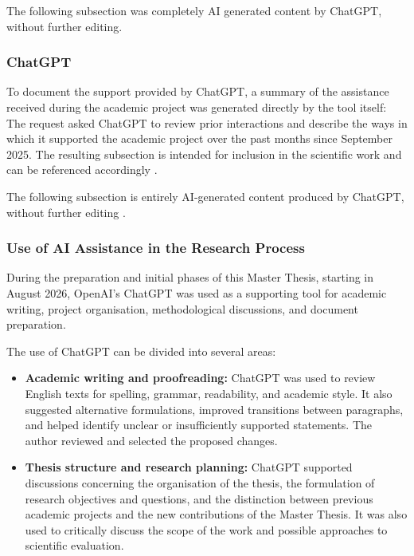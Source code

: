 The following subsection was completely AI generated content by ChatGPT, without further editing.
{\itshape
\subsubsection*{ChatGPT}

To document the support provided by ChatGPT, a summary of the assistance received during the academic project was generated directly by the tool itself:
The request asked ChatGPT to review prior interactions and describe the ways in which it supported the academic project over the past months since September 2025. The resulting subsection is intended for inclusion in the scientific work and can be referenced accordingly \cite{chatgpt_ai_assistance_2025}.



The following subsection is entirely AI-generated content produced by ChatGPT, without further editing  \cite{chatgpt_ai_assistance_2025}.

\subsubsection*{Use of AI Assistance in the Research Process}
\label{sec:use_of_genai}

During the preparation and initial phases of this Master Thesis, starting in August 2026, OpenAI's ChatGPT was used as a supporting tool for academic writing, project organisation, methodological discussions, and document preparation.

The use of ChatGPT can be divided into several areas:

\begin{itemize}
    \item \textbf{Academic writing and proofreading:}
    ChatGPT was used to review English texts for spelling, grammar, readability, and academic style. It also suggested alternative formulations, improved transitions between paragraphs, and helped identify unclear or insufficiently supported statements. The author reviewed and selected the proposed changes.

    \item \textbf{Thesis structure and research planning:}
    ChatGPT supported discussions concerning the organisation of the thesis, the formulation of research objectives and questions, and the distinction between previous academic projects and the new contributions of the Master Thesis. It was also used to critically discuss the scope of the work and possible approaches to scientific evaluation.


\end{itemize}}
